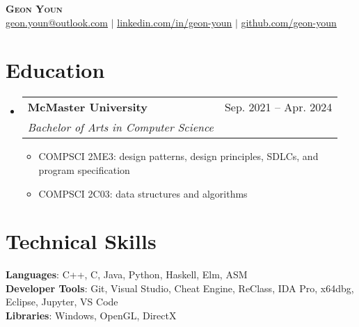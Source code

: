 \documentclass[letterpaper,11pt]{article}
\makeatletter
\newcommand{\resumeItem}[1]{
  \item\small{
    {#1 \vspace{-2pt}}
  }
}
\newcommand{\resumeSubheading}[4]{
  \vspace{-2pt}\item
    \begin{tabular*}{0.97\textwidth}[t]{l@{\extracolsep{\fill}}r}
      \textbf{#1} & #2 \\
      \textit{\small#3} & \textit{\small #4} \\
    \end{tabular*}\vspace{-7pt}
}
\newcommand{\resumeSubHeadingListStart}{\begin{itemize}[leftmargin=0.15in, label={}]}
\newcommand{\resumeSubHeadingListEnd}{\end{itemize}}
\newcommand{\resumeItemListStart}{\begin{itemize}}
\newcommand{\resumeItemListEnd}{\end{itemize}\vspace{-5pt}}
\makeatother
\begin{document}
\begin{center}
	\textbf{\Huge \scshape Geon Youn} \\ \vspace{1pt}
	\small \href{mailto:x@x.com}{\underline{geon.youn@outlook.com}} $|$ 
	\href{https://linkedin.com/in/geon-youn}{\underline{linkedin.com/in/geon-youn}} $|$
	\href{https://github.com/geon-youn}{\underline{github.com/geon-youn}}
\end{center}

\section{Education}
\resumeSubHeadingListStart
	\resumeSubheading
		{McMaster University}{Sep. 2021 -- Apr. 2024}
		{Bachelor of Arts in Computer Science}{}
	\resumeItemListStart
		\resumeItem{COMPSCI 2ME3: design patterns, design principles, SDLCs, and program specification}
		\resumeItem{COMPSCI 2C03: data structures and algorithms}
	\resumeItemListEnd
\resumeSubHeadingListEnd
  
\section{Technical Skills}
\begin{itemize}[leftmargin=0.15in, label={}]
	\small{\item{
		\textbf{Languages}{: C++, C, Java, Python, Haskell, Elm, ASM} \\
		\textbf{Developer Tools}{: Git, Visual Studio, Cheat Engine, ReClass, IDA Pro, x64dbg,  Eclipse, Jupyter, VS Code} \\
		\textbf{Libraries}{: Windows, OpenGL, DirectX}
    }}
\end{itemize}

%
      
\end{document}
